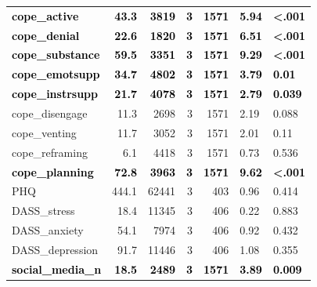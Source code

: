 \documentclass[]{article}
\begin{document}
\begin{table}[H]
\begin{tabular}[t]{lrrrrll}
\textcolor{black}{\textbf{cope\_active}} & \textcolor{black}{\textbf{43.3}} & \textcolor{black}{\textbf{3819}} & \textcolor{black}{\textbf{3}} & \textcolor{black}{\textbf{1571}} & \textcolor{black}{\textbf{5.94}} & \textcolor{black}{\textbf{<.001}}\\
\addlinespace
\textcolor{black}{\textbf{cope\_denial}} & \textcolor{black}{\textbf{22.6}} & \textcolor{black}{\textbf{1820}} & \textcolor{black}{\textbf{3}} & \textcolor{black}{\textbf{1571}} & \textcolor{black}{\textbf{6.51}} & \textcolor{black}{\textbf{<.001}}\\
\textcolor{black}{\textbf{cope\_substance}} & \textcolor{black}{\textbf{59.5}} & \textcolor{black}{\textbf{3351}} & \textcolor{black}{\textbf{3}} & \textcolor{black}{\textbf{1571}} & \textcolor{black}{\textbf{9.29}} & \textcolor{black}{\textbf{<.001}}\\
\textcolor{black}{\textbf{cope\_emotsupp}} & \textcolor{black}{\textbf{34.7}} & \textcolor{black}{\textbf{4802}} & \textcolor{black}{\textbf{3}} & \textcolor{black}{\textbf{1571}} & \textcolor{black}{\textbf{3.79}} & \textcolor{black}{\textbf{0.01}}\\
\textcolor{black}{\textbf{cope\_instrsupp}} & \textcolor{black}{\textbf{21.7}} & \textcolor{black}{\textbf{4078}} & \textcolor{black}{\textbf{3}} & \textcolor{black}{\textbf{1571}} & \textcolor{black}{\textbf{2.79}} & \textcolor{black}{\textbf{0.039}}\\
cope\_disengage & 11.3 & 2698 & 3 & 1571 & 2.19 & 0.088\\
\addlinespace
cope\_venting & 11.7 & 3052 & 3 & 1571 & 2.01 & 0.11\\
cope\_reframing & 6.1 & 4418 & 3 & 1571 & 0.73 & 0.536\\
\textcolor{black}{\textbf{cope\_planning}} & \textcolor{black}{\textbf{72.8}} & \textcolor{black}{\textbf{3963}} & \textcolor{black}{\textbf{3}} & \textcolor{black}{\textbf{1571}} & \textcolor{black}{\textbf{9.62}} & \textcolor{black}{\textbf{<.001}}\\
PHQ & 444.1 & 62441 & 3 & 403 & 0.96 & 0.414\\
DASS\_stress & 18.4 & 11345 & 3 & 406 & 0.22 & 0.883\\
\addlinespace
DASS\_anxiety & 54.1 & 7974 & 3 & 406 & 0.92 & 0.432\\
DASS\_depression & 91.7 & 11446 & 3 & 406 & 1.08 & 0.355\\
\textcolor{black}{\textbf{social\_media\_n}} & \textcolor{black}{\textbf{18.5}} & \textcolor{black}{\textbf{2489}} & \textcolor{black}{\textbf{3}} & \textcolor{black}{\textbf{1571}} & \textcolor{black}{\textbf{3.89}} & \textcolor{black}{\textbf{0.009}}\\

\end{tabular}
\end{table}
\end{document}
